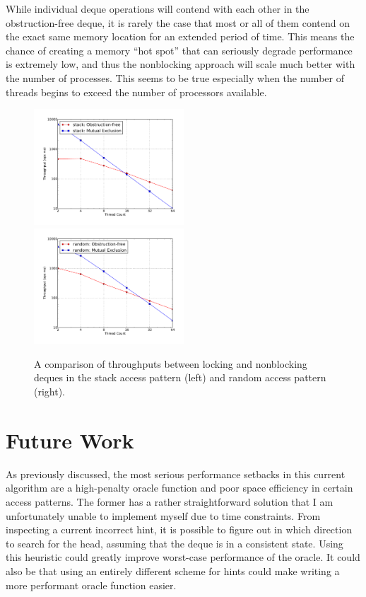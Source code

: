 \documentclass[11pt, letterpaper]{article}
\begin{document}
            While individual deque operations will contend with each other in the obstruction-free deque, it is rarely the case that most or all of them contend on the exact same memory location for an extended period of time. This means the chance of creating a memory ``hot spot'' that can seriously degrade performance is extremely low, and thus the nonblocking approach will scale much better with the number of processes. This seems to be true especially when the number of threads begins to exceed the number of processors available.

        \begin{figure}[t!]
            \includegraphics[width=0.5\textwidth]{unbounded/exp/plot/comp_throughput_stack.pdf}
            \includegraphics[width=0.5\textwidth]{unbounded/exp/plot/comp_throughput_random.pdf}
            \caption{A comparison of throughputs between locking and nonblocking deques in the stack access pattern (left) and random access pattern (right).}
            \label{figure::thru-plot}
        \end{figure}

    \section{Future Work}
        As previously discussed, the most serious performance setbacks in this current algorithm are a high-penalty oracle function and poor space efficiency in certain access patterns. The former has a rather straightforward solution that I am unfortunately unable to implement myself due to time constraints. From inspecting a current incorrect hint, it is possible to figure out in which direction to search for the head, assuming that the deque is in a consistent state. Using this heuristic could greatly improve worst-case performance of the oracle. It could also be that using an entirely different scheme for hints could make writing a more performant oracle function easier.
\end{document}
